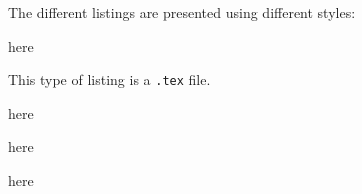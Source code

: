  The different listings are presented using different styles:

  \begin{minipage}{.4\linewidth}
   here
  \end{minipage}%
  \hfill
  \begin{minipage}{.4\linewidth}
   This type of listing is a \texttt{.tex} file.
  \end{minipage}%

  \begin{minipage}{.4\linewidth}
   here
  \end{minipage}%
  \hfill
  \begin{minipage}{.4\linewidth}
      here
  \end{minipage}%

  \begin{minipage}{.6\linewidth}
   here
  \end{minipage}%
